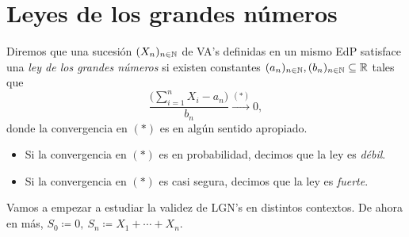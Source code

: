 \chapter{Leyes de los grandes números}


\begin{definition}
	Diremos que una sucesión $(X_{n})_{n \in \mathbb{N}}$ de VA's definidas en un mismo EdP satisface una \textit{ley de los grandes números} si existen constantes $(a_{n})_{n \in \mathbb{N}}, (b_{n})_{n \in \mathbb{N}} \subseteq \mathbb{R}$ tales que
	\[ \frac{\Big( \sum_{i=1}^{n} X_{i} - a_{n} \Big)}{b_{n}} \stackrel{(*)}{\longrightarrow} 0, \]
	donde la convergencia en $(*)$ es en algún sentido apropiado.
	\begin{itemize}
		\item Si la convergencia en $(*)$ es en probabilidad, decimos que la ley es \textit{débil}.

		\item Si la convergencia en $(*)$ es casi segura, decimos que la ley es \textit{fuerte}.
	\end{itemize}
\end{definition}

\begin{note}
	Vamos a empezar a estudiar la validez de LGN's en distintos contextos. De ahora en más, $S_{0} \coloneq 0,\ S_{n} \coloneq X_{1} + \cdots + X_{n}$.
\end{note}

